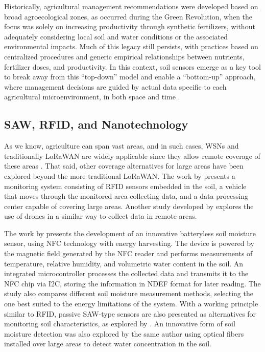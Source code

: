 \documentclass[conference]{IEEEtran}
\begin{document}
Historically, agricultural management recommendations were developed based on broad agroecological zones, as occurred during the Green Revolution, when the focus was solely on increasing productivity through synthetic fertilizers, without adequately considering local soil and water conditions or the associated environmental impacts. Much of this legacy still persists, with practices based on centralized procedures and generic empirical relationships between nutrients, fertilizer doses, and productivity. In this context, soil sensors emerge as a key tool to break away from this “top-down” model and enable a “bottom-up” approach, where management decisions are guided by actual data specific to each agricultural microenvironment, in both space and time \cite{viscarrarossel_2016_soil}.

\subsection{SAW, RFID, and Nanotechnology}

As we know, agriculture can span vast areas, and in such cases, WSNs and traditionally LoRaWAN are widely applicable since they allow remote coverage of these areas \cite{deng_2020_novel}. That said, other coverage alternatives for large areas have been explored beyond the more traditional LoRaWAN. The work by \cite{deng_2020_novel} presents a monitoring system consisting of RFID sensors embedded in the soil, a vehicle that moves through the monitored area collecting data, and a data processing center capable of covering large areas. Another study developed by \cite{akhileshnagpure_2022_water} explores the use of drones in a similar way to collect data in remote areas.

The work by \cite{boada_2018_batteryless} presents the development of an innovative batteryless soil moisture sensor, using NFC technology with energy harvesting. The device is powered by the magnetic field generated by the NFC reader and performs measurements of temperature, relative humidity, and volumetric water content in the soil. An integrated microcontroller processes the collected data and transmits it to the NFC chip via I2C, storing the information in NDEF format for later reading. The study also compares different soil moisture measurement methods, selecting the one best suited to the energy limitations of the system. With a working principle similar to RFID, passive SAW-type sensors are also presented as alternatives for monitoring soil characteristics, as explored by \cite{akhileshnagpure_2022_water}. An innovative form of soil moisture detection was also explored by the same author using optical fibers installed over large areas to detect water concentration in the soil.
\end{document}
